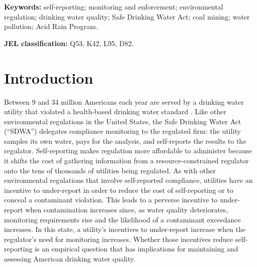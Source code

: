 \documentclass[12pt]{article}
\begin{document}
\begingroup
\vspace{0.5em}
\centering
\begin{minipage}{0.85\textwidth}
\singlespacing\footnotesize
\noindent\textbf{Keywords:} self-reporting; monitoring and enforcement; environmental regulation; drinking water quality; Safe Drinking Water Act; coal mining; water pollution; Acid Rain Program.
\par\smallskip
\noindent\textbf{JEL classification:} Q53, K42, L95, D82.
\end{minipage}
\par
\endgroup

\newpage
\onehalfspacing


\section{Introduction}

Between 9 and 34 million Americans each year are served by a drinking water utility that violated a health-based drinking water standard \parencite{allaire2018national}. Like other environmental regulations in the United States, the Safe Drinking Water Act (``SDWA'') delegates compliance monitoring to the regulated firm: the utility samples its own water, pays for the analysis, and self-reports the results to the regulator. Self-reporting makes regulation more affordable to administer because it shifts the cost of gathering information from a resource-constrained regulator onto the tens of thousands of utilities being regulated. As with other environmental regulations that involve self-reported compliance, utilities have an incentive to under-report in order to reduce the cost of self-reporting or to conceal a contaminant violation. This leads to a perverse incentive to under-report when contamination increases since, as water quality deteriorates, monitoring requirements rise and the likelihood of a contaminant exceedance increases. In this state, a utility's incentives to under-report increase when the regulator's need for monitoring increases. Whether those incentives reduce self-reporting is an empirical question that has implications for maintaining and assessing American drinking water quality. 
\end{document}
